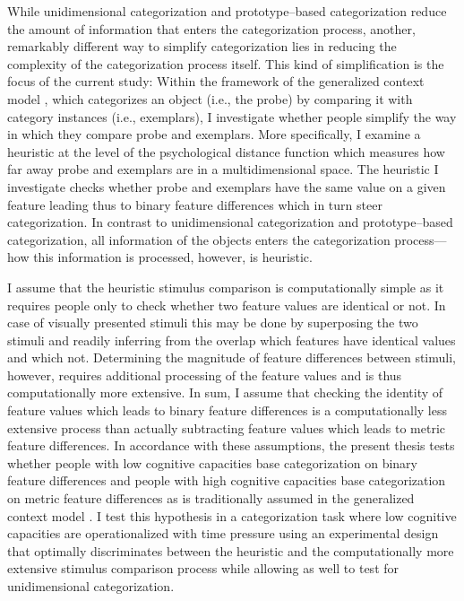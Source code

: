 \documentclass[a4paper,man,natbib]{apa6}
\begin{document}
While unidimensional categorization and prototype--based categorization reduce the amount of information that enters the categorization process, another, remarkably different way to simplify categorization lies in reducing the complexity of the categorization process itself. This kind of simplification is the focus of the current study: Within the framework of the generalized context model \citep{nosofsky1986attention}, which categorizes an object (i.e., the probe) by comparing it with 
category instances (i.e., exemplars), I investigate whether people simplify the way in which they compare probe and exemplars. 
More specifically, I examine a heuristic at the level of the psychological distance function which measures how far away probe and exemplars are in a multidimensional space. The heuristic I investigate checks whether probe and exemplars have the same value on a given feature leading thus to binary feature differences which in turn steer categorization. In contrast to unidimensional categorization and prototype--based categorization, all information of the objects enters the categorization process---how this information is processed, however, is heuristic. 

I assume that the heuristic stimulus comparison is computationally simple as it requires people only to check whether two feature values are identical or not. In case of visually presented stimuli this may be done by superposing the two stimuli and readily inferring from the overlap which features have identical values and which not. Determining the magnitude of feature differences between stimuli, however, requires additional processing of the feature values and is thus computationally more extensive. In sum, I assume that checking the identity of feature values which leads to binary feature differences is a computationally less extensive process than actually subtracting feature values which leads to metric feature differences. 
In accordance with these assumptions, the present thesis tests whether people with low cognitive capacities base categorization on binary feature differences and people with high cognitive capacities base categorization on metric feature differences as is traditionally assumed in the generalized context model \citep{nosofsky1986attention}. I test this hypothesis in a categorization task where low cognitive capacities are operationalized with time pressure using an experimental design that optimally discriminates between the heuristic and the computationally more extensive stimulus comparison process while allowing as well to test for unidimensional categorization. 
\end{document}
